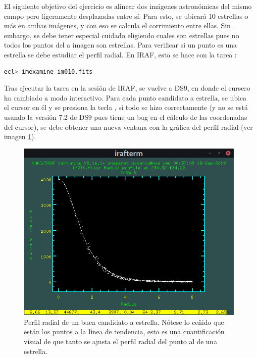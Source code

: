 \documentclass[12pt]{article}
\begin{document}
El siguiente objetivo del ejercicio es alinear dos imágenes astronómicas del mismo campo pero ligeramente desplazadas entre sí.
Para esto, se ubicará 10 estrellas o más en ambas imágenes, y con eso se calcula el corrimiento entre ellas.
Sin embargo, se debe tener especial cuidado eligiendo cuales son estrellas pues no todos los puntos del a imagen son estrellas.
Para verificar si un punto es una estrella se debe estudiar el perfil radial.
En IRAF, esto se hace con la tarea :
\begin{lstlisting}[language=bash]
ecl> imexamine im010.fits
\end{lstlisting}     


 Tras ejecutar la tarea en la sesión de IRAF, se vuelve a DS9, en donde el cursero ha cambiado a modo interactivo. Para cada punto candidato a estrella, se ubica el cursor en él y se presiona la tecla , si todo se hizo correctamente (y no se está usando la versión 7.2 de DS9 pues tiene un bug en el cálculo de las coordenadas del cursor),	 se debe obtener una nueva ventana con la gráfica del perfil radial (ver imagen \ref{im05}). 


\begin{figure}[H]
  \centering
   \includegraphics[scale= 0.6]{im05.png}
  \caption{Perfil radial de un buen candidato a estrella. Nótese lo ceñido que están los puntos a la línea de tendencia, esto es una cuantificación visual de que tanto se ajusta el perfil radial del punto al de una estrella.}
  \label{im05}
\end{figure}
\end{document}
